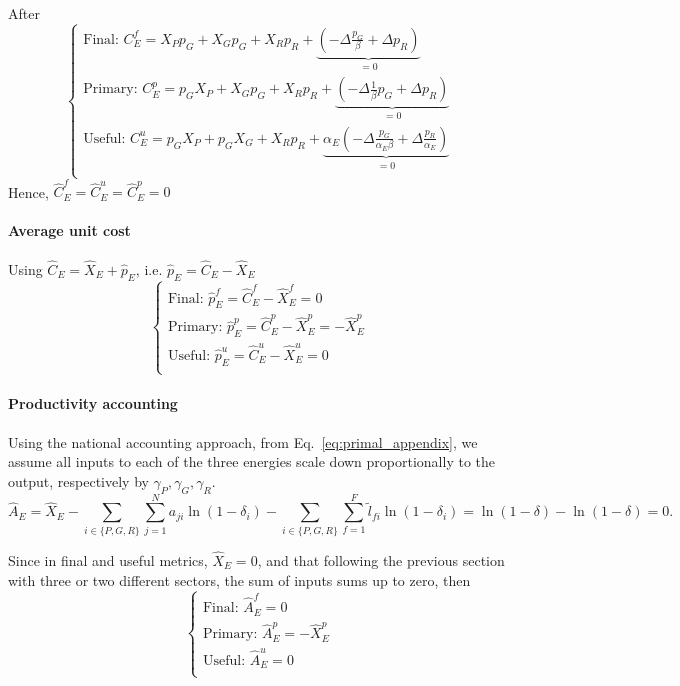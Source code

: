 \documentclass[11pt]{article}
\begin{document}
After
\begin{equation*}
    \begin{cases}
        \text{Final: }C_E^f=X_Pp_G+X_Gp_G + X_Rp_R+\underbrace{(-\Delta\frac{p_G}{\beta} + \Delta p_R )}_{=0}\\
         \text{Primary: }C_E^p= p_GX_P+ X_Gp_G+X_Rp_R +  \underbrace{(-\Delta \frac{1}{\beta}p_G +\Delta p_R)}_{=0} \\
        \text{Useful: }C_E^u= p_GX_P+ p_G X_G+ X_R p_R+\underbrace{\alpha_E(-\Delta\frac{p_G}{\alpha_E\beta} + \Delta \frac{p_R}{\alpha_E} )}_{=0}  \\
    \end{cases}
\end{equation*}
Hence, $\hat{C}_E^f=\hat{C}_E^u=\hat{C}_E^p=0$




\paragraph{Average unit cost} Using 
$  \hat{C}_E= \hat{X}_E + \hat{p}_E$, i.e. $  \hat{p}_E=\hat{C}_E- \hat{X}_E$
\begin{equation*}
    \begin{cases}
        \text{Final: }\hat{p}_E^f=\hat{C}_E^f- \hat{X}_E^f=0\\
         \text{Primary: }\hat{p}_E^p= \hat{C}_E^p- \hat{X}_E^p=- \hat{X}_E^p \\
        \text{Useful: }\hat{p}_E^u=\hat{C}_E^u- \hat{X}_E^u=0  \\
    \end{cases}
\end{equation*}


\paragraph{Productivity accounting} 
Using the national accounting approach, from Eq.~\ref{eq:primal_appendix}, we assume all inputs to each of the three energies scale down proportionally to the output, respectively by $\gamma_P,\gamma_G, \gamma_R$. 
\[
    \hat{A}_E
= \hat{X}_E
  - \sum_{i\in \{P,G,R\}}\sum_{j=1}^N a_{ji}\ln(1-\delta_i)
  -  \sum_{i\in \{P,G,R\}}\sum_{f=1}^F \tilde{l}_{fi}\ln(1-\delta_i)
= \ln(1-\delta)  -  \ln(1-\delta)
= 0.
\]

Since in final and useful metrics, $\hat{X}_E=0$, and that following the previous section with three or two different sectors, the sum of inputs sums up to zero, then 
\begin{equation*}
    \begin{cases}
        \text{Final: }\hat{A}_E^f=0\\
         \text{Primary: }\hat{A}_E^p= -\hat{X}_E^p  \\
        \text{Useful: }\hat{A}_E^u=0  \\
    \end{cases}
\end{equation*}
\end{document}
